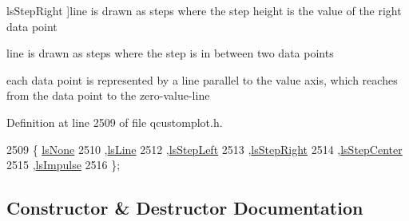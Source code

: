 \begin{Desc}
\begin{description}
{\hypertarget{class_q_c_p_graph_ad60175cd9b5cac937c5ee685c32c0859a9c37951f7d11aa070100fd16f2935c9e}{}ls\+Step\+Right\label{class_q_c_p_graph_ad60175cd9b5cac937c5ee685c32c0859a9c37951f7d11aa070100fd16f2935c9e}
}]line is drawn as steps where the step height is the value of the right data point \item[{\em 
\hypertarget{class_q_c_p_graph_ad60175cd9b5cac937c5ee685c32c0859a5adf7b04da215a40a764c21294ea7366}{}ls\+Step\+Center\label{class_q_c_p_graph_ad60175cd9b5cac937c5ee685c32c0859a5adf7b04da215a40a764c21294ea7366}
}]line is drawn as steps where the step is in between two data points \item[{\em 
\hypertarget{class_q_c_p_graph_ad60175cd9b5cac937c5ee685c32c0859aa3b358b4ae7cca94aceeb8e529c12ebb}{}ls\+Impulse\label{class_q_c_p_graph_ad60175cd9b5cac937c5ee685c32c0859aa3b358b4ae7cca94aceeb8e529c12ebb}
}]each data point is represented by a line parallel to the value axis, which reaches from the data point to the zero-\/value-\/line \end{description}
\end{Desc}


Definition at line 2509 of file qcustomplot.\+h.


\begin{DoxyCode}
2509                  \{ \hyperlink{class_q_c_p_graph_ad60175cd9b5cac937c5ee685c32c0859aea9591b933733cc7b20786b71e60fa04}{lsNone}        
2510                    ,\hyperlink{class_q_c_p_graph_ad60175cd9b5cac937c5ee685c32c0859a3c42a27b15aa3c92d399082fad8b7515}{lsLine}       
2512                    ,\hyperlink{class_q_c_p_graph_ad60175cd9b5cac937c5ee685c32c0859ae10568bda57836487d9dec5eba1d6c6e}{lsStepLeft}   
2513                    ,\hyperlink{class_q_c_p_graph_ad60175cd9b5cac937c5ee685c32c0859a9c37951f7d11aa070100fd16f2935c9e}{lsStepRight}  
2514                    ,\hyperlink{class_q_c_p_graph_ad60175cd9b5cac937c5ee685c32c0859a5adf7b04da215a40a764c21294ea7366}{lsStepCenter} 
2515                    ,\hyperlink{class_q_c_p_graph_ad60175cd9b5cac937c5ee685c32c0859aa3b358b4ae7cca94aceeb8e529c12ebb}{lsImpulse}    
2516                  \};
\end{DoxyCode}


\subsection{Constructor \& Destructor Documentation}
\hypertarget{class_q_c_p_graph_a0393a38cf7183cbf46348eb6cf9a5a6c}{}
